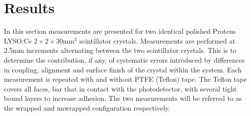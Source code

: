\section{Results}
In this section measurements are presented for two identical polished Proteus LYSO:Ce $2\times2\times30$mm$^3$ scintillator crystals. Measurements are performed at 2.5mm increments alternating between the two scintillator crystals. This is to determine the contribution, if any, of systematic errors introduced by differences in coupling, alignment and surface finish of the crystal within the system. Each measurement is repeated with and without PTFE (Teflon) tape. The Teflon tape covers all faces, bar that in contact with the photodetector, with several tight bound layers to increase adhesion. The two measurements will be referred to as the wrapped and unwrapped configuration respectively.